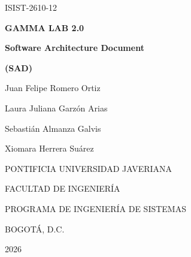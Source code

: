 \documentclass[11pt,a4paper]{article}
\DeclareRobustCommand{\_}{\textunderscore\allowbreak}
\begin{document}
\providecommand{\tituloProyecto}{GAMMA LAB 2.0}
\providecommand{\grupo}{ISIST-2610-12}
\providecommand{\autorUno}{Juan Felipe Romero Ortiz}
\providecommand{\autorDos}{Laura Juliana Garzón Arias}
\providecommand{\autorTres}{Sebastián Almanza Galvis}
\providecommand{\autorCuatro}{Xiomara Herrera Suárez}
\providecommand{\leyendaGrado}{MEMORIA DE PROYECTO DE GRADO REALIZADO PARA CUMPLIR UNO DE
LOS REQUISITOS PARA EL TÍTULO EN INGENIERÍA DE SISTEMAS}
\providecommand{\director}{Ing. Cécile Gauthier Umaña}
\providecommand{\juradoUno}{Ing. Leonardo Flórez}
\providecommand{\juradoDos}{Ing. Alexander Caicedo}
\providecommand{\universidad}{PONTIFICIA UNIVERSIDAD JAVERIANA}
\providecommand{\universidadNombre}{Pontificia Universidad Javeriana}
\providecommand{\facultad}{FACULTAD DE INGENIERÍA}
\providecommand{\programa}{PROGRAMA DE INGENIERÍA DE SISTEMAS}
\providecommand{\ciudad}{BOGOTÁ, D.C.}
\providecommand{\anio}{2026}
\providecommand{\fechaLarga}{Noviembre, 2026}
\providecommand{\rector}{P. Luis Fernando Múnera Congote, S.J.}
\providecommand{\decano}{Ing. Diego Alejandro Patiño Guevara, Ph.D.}
\providecommand{\directorDepto}{Ing. César Julio Bustacara Medina, Ph.D.}
\providecommand{\directorCarrera}{Ing. Andrea del Pilar Rueda Olarte}

\begingroup\setlength{\parskip}{0pt}%

\thispagestyle{empty}
\begin{center}
  \vspace*{1cm}
  {\large \grupo}\par\vspace{1.2cm}
  {\LARGE\bfseries \tituloProyecto}\par\vspace{1cm}
  {\Large\bfseries Software Architecture Document}\par\vspace{0.3cm}
  {\large\bfseries (SAD)}\par\vspace{2cm}
  \autorUno\par
  \autorDos\par
  \autorTres\par
  \autorCuatro\par
  \vfill
  \universidad\par
  \facultad\par
  \programa\par
  \ciudad\par
  \anio\par
  \vspace{1cm}
\end{center}
\clearpage
\end{document}
